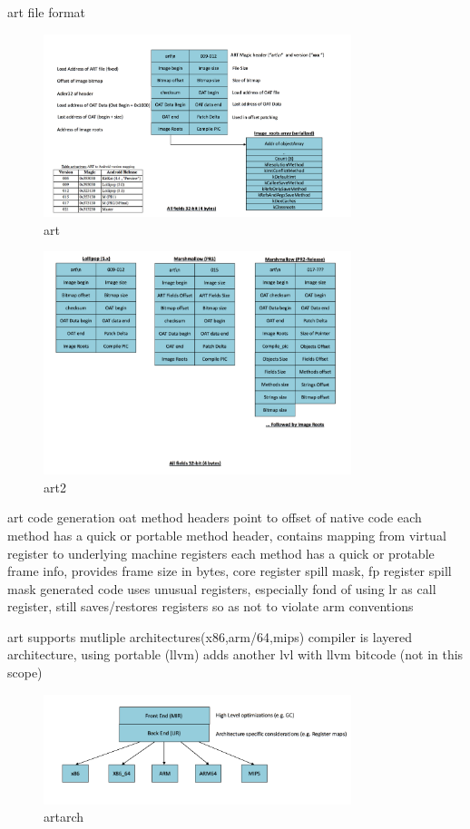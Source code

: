 art file format
\begin{figure}[h]
    \centering
    \includegraphics[width=0.8\textwidth]{data/art.png}
    \caption{art}
    \label{fig:art}
\end{figure}
\begin{figure}[h]
    \centering
    \includegraphics[width=0.8\textwidth]{data/art2.png}
    \caption{art2}
    \label{fig:art2}
\end{figure}

art code generation
oat method headers point to offset of native code
each method has a quick or portable method header, contains mapping from virtual register to underlying machine registers
each method has a quick or protable frame info, provides frame size in bytes, core register spill mask, fp register spill mask
generated code uses unusual registers, especially fond of using lr as call register, still saves/restores registers so as not to violate arm conventions
\newline

art supports mutliple architectures(x86,arm/64,mips)
compiler is layered architecture, using portable (llvm) adds another lvl with llvm bitcode (not in this scope)
\begin{figure}[h]
    \centering
    \includegraphics[width=0.8\textwidth]{data/artarch.png}
    \caption{artarch}
    \label{fig:artarch}
\end{figure}

